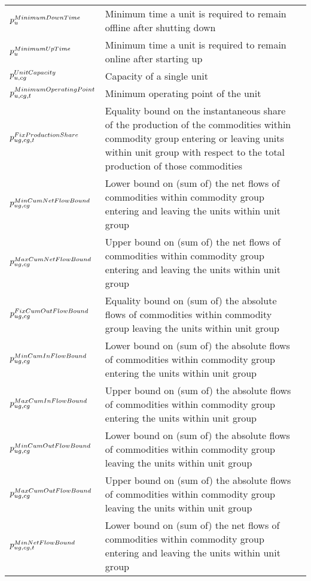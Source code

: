 \begin{longtable}{p{\cola} p{\colc} >{\small\raggedleft\arraybackslash\itshape}p{\colb}}
		$p^{MinimumDownTime}_{u}$	& Minimum time a unit is required to remain offline after shutting down	&                \\
		$p^{MinimumUpTime}_{u}$	& Minimum time a unit is required to remain online after starting up	&                \\
		$p^{UnitCapacity}_{u,cg} $	& Capacity of a single unit                                   	&                \\
		$p^{MinimumOperatingPoint}_{u,cg,t}$	& Minimum operating point of the unit                         	&                \\
		$p^{FixProductionShare}_{ug,cg,t}$	& Equality bound on the instantaneous share of the production of the commodities within commodity group \commoditygroup entering or leaving units within unit group \unitgroup with respect to the total production of those commodities	&                \\
		$p^{MinCumNetFlowBound}_{ug,cg}$	& Lower bound on (sum of) the net flows of commodities within commodity group \commoditygroup entering and leaving the units within unit group \unitgroup 	&                \\
		$p^{MaxCumNetFlowBound}_{ug,cg}$	& Upper bound on (sum of) the net flows of commodities within commodity group \commoditygroup entering and leaving the units within unit group \unitgroup 	&                \\
		$p^{FixCumOutFlowBound}_{ug,cg}$	& Equality bound on (sum of) the absolute flows of commodities within commodity group \commoditygroup leaving the units within unit group \unitgroup 	&                \\
		$p^{MinCumInFlowBound}_{ug,cg}$	& Lower bound on (sum of) the absolute flows of commodities within commodity group \commoditygroup entering the units within unit group \unitgroup 	&                \\
		$p^{MaxCumInFlowBound}_{ug,cg}$	& Upper bound on (sum of) the absolute flows of commodities within commodity group \commoditygroup entering the units within unit group \unitgroup 	&                \\
		$p^{MinCumOutFlowBound}_{ug,cg}$	& Lower bound on (sum of) the absolute flows of commodities within commodity group \commoditygroup leaving the units within unit group \unitgroup 	&                \\
		$p^{MaxCumOutFlowBound}_{ug,cg}$	& Upper bound on (sum of) the absolute flows of commodities within commodity group \commoditygroup leaving the units within unit group \unitgroup 	&                \\
		$p^{MinNetFlowBound}_{ug,cg,t}$	& Lower bound on (sum of) the net flows of commodities within commodity group \commoditygroup entering and leaving the units within unit group \unitgroup 	&                \\

\end{longtable}
